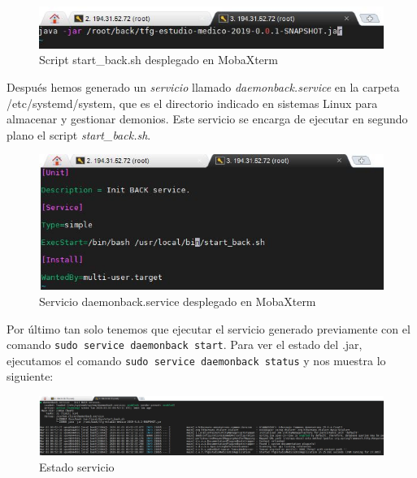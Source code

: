     \begin{figure}[h]
    \centering
     \includegraphics[width=1\textwidth]{images/script}
    \caption{Script start\_back.sh desplegado en MobaXterm}
    \end{figure}
    
    Después hemos generado un \textit{servicio} llamado \textit{daemonback.service} en la carpeta /etc/systemd/system, que es el directorio indicado en sistemas Linux para almacenar y gestionar demonios. Este servicio se encarga de ejecutar en segundo plano el script \textit{start\_back.sh}. 
    
    \begin{figure}[h]
    \centering
     \includegraphics[width=1\textwidth]{images/demonio}
    \caption{Servicio daemonback.service desplegado en MobaXterm}
    \end{figure}
    
    Por último tan solo tenemos que ejecutar el servicio generado previamente con el comando \texttt{sudo service daemonback start}. Para ver el estado del .jar, ejecutamos el comando \texttt{sudo service daemonback status} y nos muestra lo siguiente:
    
    \begin{figure}[h]
    \centering
     \includegraphics[width=1\textwidth]{images/serviciostart}
    \caption{Estado servicio}
    \end{figure}
    
    
    


